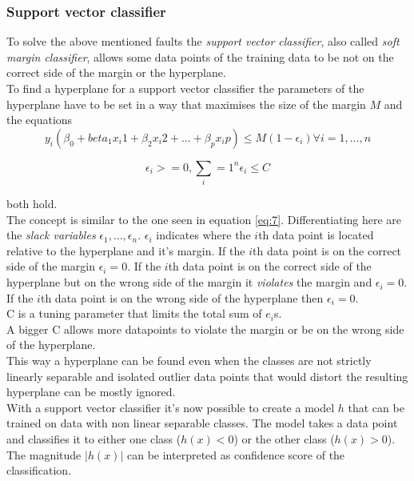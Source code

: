 \subsubsection{Support vector classifier}

To solve the above mentioned faults the \emph{support vector classifier}, also called \emph{soft margin classifier}, allows some data points of the training data to be not on the correct side of the margin or the hyperplane. 
\\
To find a hyperplane for a support vector classifier the parameters of the hyperplane have to be set in a way that maximises the size of the margin $M$ and the equations 
\begin{equation} \label{eq:8}
y_i(\beta_0+beta_1 x_i1 +\beta_2 x_i2 + ... +\beta_p x_ip) \leq M(1- \epsilon_i ) \forall i=1,...,n
\end{equation}

\begin{equation} \label{eq:9}
\epsilon_i >= 0, \sum_i=1^n \epsilon_i \leq	 C
\end{equation}

both hold.\\
The concept is similar to the one seen in equation \ref{eq:7}. Differentiating here are the \emph{slack variables} $\epsilon_1, ..., \epsilon_n$. $\epsilon_i$ indicates where the $i$th data point is located relative to the hyperplane and it's margin. If the $i$th data point is on the correct side of the margin $\epsilon_i=0$. If the $i$th data point is on the correct side of the hyperplane but on the wrong side of the margin it \emph{violates} the margin and $\epsilon_i=0$. If the $i$th data point is on the wrong side of the hyperplane then $\epsilon_i=0$.  \\
C is a tuning parameter that limits the total sum of $e_i$s.\\
A bigger C allows more datapoints to violate the margin or be on the wrong side of the hyperplane. \\
This way a hyperplane can be found even when the classes are not strictly linearly separable and isolated outlier data points that would  distort the resulting hyperplane can be mostly ignored.\\


With a support vector classifier it's now possible to create a model $h$ that can be trained on data with non linear separable classes. The model takes a data point and classifies it to either one class ($h(x)<0$) or the other class ($h(x)>0$). The magnitude $|h(x)|$ can be interpreted as confidence score of the classification.
 
